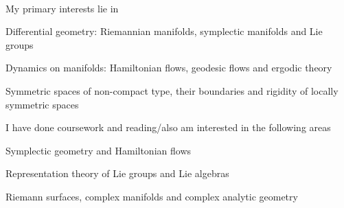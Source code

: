 \documentclass{LoLaTeXcv}
\begin{document}

\

My primary interests lie in

\begin{lltxItemize}
	\item Differential geometry: Riemannian manifolds, symplectic manifolds and Lie groups
	\item Dynamics on manifolds: Hamiltonian flows, geodesic flows and ergodic theory
	\item Symmetric spaces of non-compact type, their boundaries and rigidity of locally symmetric spaces
\end{lltxItemize}

I have done coursework and reading/also am interested in the following areas


\begin{lltxItemize}
	\item Symplectic geometry and Hamiltonian flows
	\item Representation theory of Lie groups and Lie algebras
	\item Riemann surfaces, complex manifolds and complex analytic geometry
\end{lltxItemize}


\end{document}
